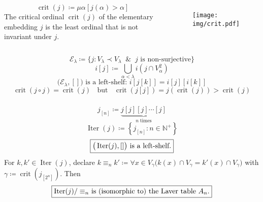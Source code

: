 \documentclass[UTF8,aspectratio=43,11pt,colorlinks,compress,openany]{beamer}%
\begin{document}
\begin{frame}\frametitle{}
\begin{columns}
\[\operatorname{crit}(j)\coloneqq \mu\alpha[j(\alpha)>\alpha]\]
The critical ordinal $\operatorname{crit}(j)$ of the elementary embedding $j$ is the least ordinal that is not invariant under $j$.
\begin{figure}[htb]
\texttt{[image: img/crit.pdf]}
\end{figure}
\end{columns}
\[\mathcal{E}_\lambda\coloneqq \{j: V_\lambda\prec V_\lambda\;\;\&\;\;j\mbox{ is non-surjective}\}\]
\[i[j]\coloneqq \bigcup\limits_{\alpha<\lambda}i(j\cap V_\alpha^2)\]
\[\big(\mathcal{E}_\lambda,[]\big)\mbox{ is a left-shelf: } i[j[k]]=i[j][i[k]]\]
\[\operatorname{crit}(j\circ j)=\operatorname{crit}(j)\;\;\mbox{ but }\;\;\operatorname{crit}(j[j])=j(\operatorname{crit}(j))>\operatorname{crit}(j)\]
\end{frame}

\begin{frame}\frametitle{}
\[j_{[n]}\coloneqq \underbrace{j[j][j]\cdots[j]}_{n\;\text{times}}\]
\[\operatorname{Iter}(j)\coloneqq \left\{j_{[n]}: n\in\mathbb{N}^+\right\}\]
\[\fbox{$\big(\operatorname{Iter}(j),[]\big)$ is a left-shelf.}\]
For $k,k'\in\operatorname{Iter}(j)$, declare $k\equiv_n k'\coloneqq \forall x\in V_\gamma\big(k(x)\cap V_\gamma=k'(x)\cap V_\gamma\big)$ with $\gamma\coloneqq \operatorname{crit}(j_{[2^n]})$. Then 
\[\fbox{$\operatorname{Iter}(j)/\equiv_n$ is (isomorphic to) the Laver table $A_n$.}\]
\end{frame}
\end{document}
